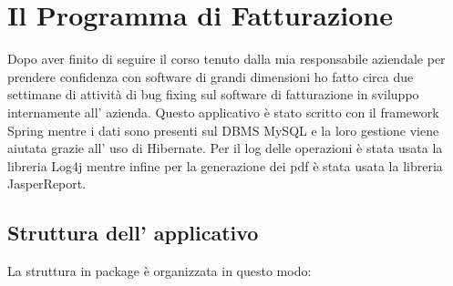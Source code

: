 \documentclass[12pt]{book}
\begin{document}
\chapter{Il Programma di Fatturazione}
Dopo aver finito di seguire il corso tenuto dalla mia responsabile aziendale
per prendere confidenza con software di grandi dimensioni ho fatto circa due 
settimane di attività di bug fixing sul software di fatturazione in sviluppo
internamente all' azienda.
Questo applicativo è stato scritto con il framework Spring mentre i dati
sono presenti sul DBMS MySQL e la loro gestione viene aiutata grazie all' uso
di Hibernate.
Per il log delle operazioni è stata usata la libreria Log4j mentre infine per 
la generazione dei pdf è stata usata la libreria JasperReport.
\section{Struttura dell' applicativo}
La struttura in package è organizzata in questo modo:
\end{document}
